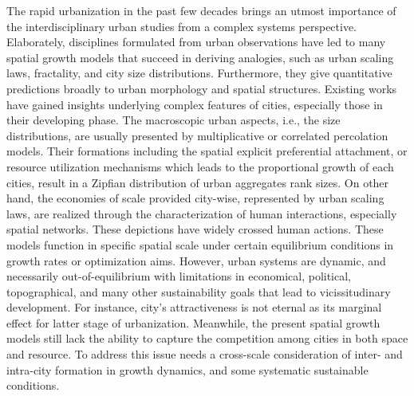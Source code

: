 \documentclass[reprint,unsortedaddress,amsmath,amssymb,aps,prl,showkeys]{revtex4-2}
\begin{document}
The rapid urbanization in the past few decades brings an utmost importance of the
interdisciplinary urban studies from a complex systems perspective. Elaborately, disciplines formulated from urban observations have led to many spatial growth models that succeed in deriving analogies\cite{Li2016}, such as urban scaling laws\cite{court2013origins}, fractality\cite{batty1994fractal,batty2007cities}, and city size distributions\cite{zipf1949human}. Furthermore, they give quantitative predictions broadly to urban morphology and spatial structures\cite{anas1998urban}. 
Existing works have gained insights underlying complex features of cities, especially those in their developing phase. The macroscopic urban aspects, i.e., the size distributions, are usually presented by multiplicative or correlated percolation\cite{makse1995modelling,PhysRevE.58.7054,rybski2013distance} models. Their formations including the spatial explicit preferential attachment\cite{schweitzer1998estimation}, or resource utilization\cite{PhysRevE.90.042815} mechanisms which leads to the proportional growth of each cities, result in a Zipfian distribution of urban aggregates rank sizes. On other hand, the economies of scale provided city-wise, represented by urban scaling laws\cite{court2013origins,batty2019urbanscalinglaw,bettencourt2007growth}, are realized through the characterization of human interactions, especially spatial networks\cite{marsili1998interacting,court2013origins,Li2017Simple}. These depictions have widely crossed human actions\cite{ccolak2016understanding,louf2014congestion,fujita1976spatial}. These models function in specific spatial scale under certain equilibrium conditions in growth rates or optimization aims\cite{zipf1949human}. However, urban systems are dynamic, and necessarily out-of-equilibrium with limitations in economical, political, topographical, and many other sustainability goals that lead to vicissitudinary
development\cite{parris2003characterizing,batty2008size}. For instance, city’s attractiveness is not eternal as its marginal effect for latter
stage of urbanization\cite{atkinson2012urban,girardin2009quantifying}. Meanwhile, the present spatial growth models still lack the ability to capture the competition among cities in both space and resource. To address this issue needs a cross-scale consideration of inter- and intra-city formation in growth dynamics, and some systematic sustainable conditions.
\end{document}
